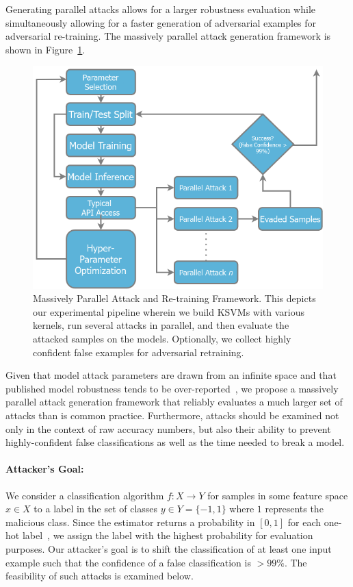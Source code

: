 \documentclass[fonts]{icst}
\begin{document}
Generating parallel attacks allows for a larger robustness evaluation while simultaneously allowing for a faster generation of adversarial examples for adversarial re-training.
The massively parallel attack generation framework is shown in Figure~\ref{fig:attack_framework}.


\begin{figure}[!htb]
\centering
\includegraphics[width=.7\textwidth]{./ppgd.png}
\caption{Massively Parallel Attack and Re-training Framework.
This depicts our experimental pipeline wherein we build KSVMs with various kernels, run several attacks in parallel, and then evaluate the attacked samples on the models.
Optionally, we collect highly confident false examples for adversarial retraining.}
\label{fig:attack_framework}

\end{figure}

Given that model attack parameters are drawn from an infinite space and that published model robustness tends to be over-reported~\cite{croce2020reliable}, we propose a massively parallel attack generation framework that reliably evaluates a much larger set of attacks than is common practice.
Furthermore, attacks should be examined not only in the context of raw accuracy numbers, but also their ability to prevent highly-confident false classifications as well as the time needed to break a model.


\paragraph{Attacker's Goal: }


We consider a classification algorithm $f: X \rightarrow Y $ for samples in some feature space $x \in X$ to a label in the set of classes $y \in Y = \{ -1, 1\}$ where $1$ represents the malicious class.
Since the estimator returns a probability in $[0,1]$ for each one-hot label~\cite{scikit-learn}, we assign the label with the highest probability for evaluation purposes.
Our attacker's goal is to shift the classification of at least one input example such that the confidence of a false classification is $>99\%$.
The feasibility of such attacks is examined below.
\end{document}
